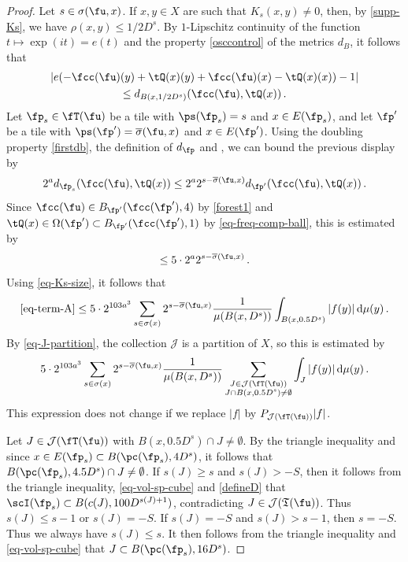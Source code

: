 \begin{proof}
    Let $s \in \sigma(\fu,x)$.
    If $x, y \in X$ are such that $K_s(x,y)\neq 0$, then, by \eqref{supp-Ks}, we have $\rho(x,y)\leq 1/2 D^s$. By $1$-Lipschitz continuity of the function $t \mapsto \exp(it) = e(t)$ and the property \eqref{osccontrol} of the metrics $d_B$, it follows that
    \begin{multline*}
        |e(-\fcc(\fu)(y)+\tQ(x)(y)+\fcc(\fu)(x)-\tQ(x)(x))-1|\\
        \leq d_{B(x, 1/2 D^{s})}(\fcc(\fu), \tQ(x))\,.
    \end{multline*}
    Let $\fp_s \in \fT(\fu)$ be a tile with $\ps(\fp_s) = s$ and $x \in E(\fp_s)$, and let $\fp'$ be a tile with $\ps(\fp') = \overline{\sigma}(\fu, x)$ and $x \in E(\fp')$.
    Using the doubling property \eqref{firstdb}, the definition of $d_{\fp}$ and , we can bound the previous display by
    $$
        2^a d_{\fp_s}(\fcc(\fu), \tQ(x)) \le 2^{a} 2^{s - \overline{\sigma}(\fu, x)} d_{\fp'}(\fcc(\fu), \tQ(x))\,.
    $$
    Since $\fcc(\fu) \in B_{\fp'}(\fcc(\fp'), 4)$ by \eqref{forest1} and $\tQ(x) \in \Omega(\fp') \subset B_{\fp'}(\fcc(\fp'), 1)$ by \eqref{eq-freq-comp-ball}, this is estimated by
    $$
        \le 5 \cdot 2^{a} 2^{s - \overline{\sigma}(\fu, x)} \,.
    $$
    Using \eqref{eq-Ks-size}, it follows that
    $$
        \eqref{eq-term-A} \le 5\cdot 2^{103a^3} \sum_{s\in\sigma(x)}2^{s - \overline{\sigma}(\fu, x)} \frac{1}{\mu(B(x,D^s))}\int_{B(x,0.5D^{s})}|f(y)|\,\mathrm{d}\mu(y)\,.
    $$
    By \eqref{eq-J-partition}, the collection $\mathcal{J}$ is a partition of $X$, so this is estimated by
    $$
         5\cdot 2^{103a^3} \sum_{s\in\sigma(x)}2^{s - \overline{\sigma}(\fu, x)} \frac{1}{\mu(B(x,D^s))}\sum_{\substack{J \in \mathcal{J}(\fT(\fu))\\J \cap B(x, 0.5D^s) \ne \emptyset} }\int_{J}|f(y)|\,\mathrm{d}\mu(y)\,.
    $$
    This expression does not change if we replace $|f|$ by $P_{\mathcal{J}(\fT(\fu))}|f|$.

    Let $J \in \mathcal{J}(\fT(\fu))$ with $B(x, 0.5 D^s) \cap J \ne \emptyset$. By the triangle inequality and since $x \in E(\fp_s) \subset B(\pc(\fp_s), 4D^{s})$, it follows that $B(\pc(\fp_s), 4.5D^s) \cap J \ne \emptyset$. If $s(J) \ge s$ and $s(J) > -S$, then it follows from the triangle inequality, \eqref{eq-vol-sp-cube} and \eqref{defineD} that $\scI(\fp_s) \subset B(c(J), 100 D^{s(J)+1})$, contradicting $J \in \mathcal{J}(\mathfrak{T}(\fu))$. Thus $s(J) \le s - 1$ or $s(J) = -S$. If $s(J) = -S$ and $s(J) > s - 1$, then $s = -S$. Thus we always have $s(J) \le s$. It then follows from the triangle inequality and \eqref{eq-vol-sp-cube} that $J \subset B(\pc(\fp_s), 16 D^s)$.


\end{proof}
